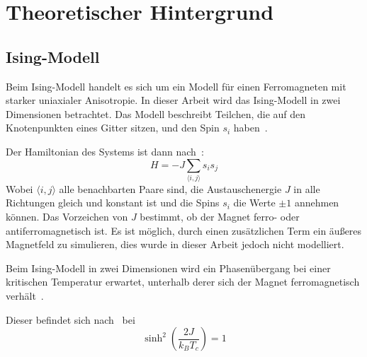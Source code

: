 \chapter{Theoretischer Hintergrund}
	\label{chap:theorie}
	
	
	\section{Ising-Modell}
	\label{sec:isingtheorie}
	Beim Ising-Modell handelt es sich um ein Modell für einen Ferromagneten mit starker uniaxialer Anisotropie. %
	In dieser Arbeit wird das Ising-Modell in zwei Dimensionen betrachtet. Das Modell beschreibt Teilchen, die auf den Knotenpunkten eines Gitter sitzen, und den Spin $s_i$ haben~\cite[S. 7]{binderheermann}. 
	
	Der Hamiltonian des Systems ist dann nach~\cite[S. 7]{binderheermann}:
	\begin{equation}
	H=-J\sum_{\langle i,j\rangle }s_is_j
	\label{eq:hamiltonianising}
	\end{equation}
	Wobei $\langle i,j\rangle$ alle benachbarten Paare sind, die Austauschenergie $J$ in alle Richtungen gleich und konstant ist und die Spins $s_i$ die  Werte $\pm 1$ annehmen können. Das Vorzeichen von $J$ bestimmt, ob der Magnet ferro- oder antiferromagnetisch ist. Es ist möglich, durch einen zusätzlichen Term ein äußeres Magnetfeld zu simulieren, dies wurde in dieser Arbeit jedoch nicht modelliert.%

	
	Beim Ising-Modell in zwei Dimensionen wird ein Phasenübergang bei einer kritischen Temperatur erwartet, unterhalb derer sich der Magnet ferromagnetisch verhält~\cite[vgl. ][]{peierls_1936}.
	
	Dieser befindet sich nach~\cite{OnsagerCrystal1} bei \[\sinh^2\left(\frac{2J}{k_BT_c}\right) =1\]
	

